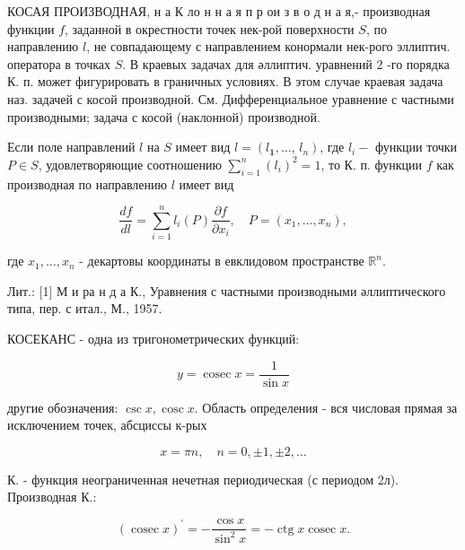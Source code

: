 \documentclass[10pt]{article}
\begin{document}
КОСАЯ ПРОИЗВОДНАЯ, н а К ло н н а я п р ои з в о д н а я,- производная функции $f$, заданной в окрестности точек нек-рой поверхности $S$, по направлению $l$, не совпадающему с направлением конормали нек-рого эллиптич. оператора в точках $S$. В краевых задачах для әллиптич. уравнений 2 -го порядка К. п. может фигурировать в граничных условиях. В этом случае краевая задача наз. задачей с косой производной. См. Дифференциальное уравнение с частными производными; задача с косой (наклонной) производной.



Если поле направлений $l$ на $S$ имеет вид $l=\left(l_{\mathbf{1}}, \ldots\right.$, $\left.l_{n}\right)$, где $l_{i}-$ функции точки $P \in S$, удовлетворяющие соотношению $\sum_{i=1}^{n}\left(l_{i}\right)^{2}=1$, то К. п. функции $f$ как производная по направлению $l$ имеет вид



\[

\frac{d f}{d l}=\sum_{i=1}^{n} l_{i}(P) \frac{\partial f}{\partial x_{i}}, \quad P=\left(x_{1}, \ldots, x_{n}\right),

\]



где $x_{1}, \ldots, x_{n}$ - декартовы координаты в евклидовом пространстве $\mathbb{R}^{n}$.



Лит.: [1] М и ра н д а К., Уравнения с частными производными әллиптического типа, пер. с итал., М., 1957.



КОСЕКАНС - одна из тригонометрических функций:



\[

y=\operatorname{cosec} x=\frac{1}{\sin x}

\]



другие обозначения: $\csc x, \operatorname{cosc} x$. Область определения - вся числовая прямая за исключением точек, абсциссы к-рых



\[

x=\pi n, \quad n=0, \pm 1, \pm 2, \ldots

\]



К. - функция неограниченная нечетная периодическая (с периодом 2л). Производная К.:



\[

(\operatorname{cosec} x)^{\prime}=-\frac{\cos x}{\sin ^{2} x}=-\operatorname{ctg} x \operatorname{cosec} x .

\]
\end{document}
